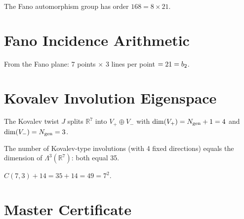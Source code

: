 \begin{theorem}[$|\mathrm{PSL}(2,7)| = \mathrm{rank}(E_8) \times \btwo$]\label{thm:PSL27_factored}
    \leanok
    The Fano automorphism group has order $168 = 8 \times 21$.
\end{theorem}

\section{Fano Incidence Arithmetic}

\begin{theorem}[$\btwo = \opdim(K_7) \times N_{\mathrm{gen}}$]\label{thm:b2_fano_incidence}
    \leanok
    From the Fano plane: 7 points $\times$ 3 lines per point $= 21 = b_2$.
\end{theorem}

\section{Kovalev Involution Eigenspace}

\begin{theorem}\label{thm:kovalev_eigenspace}
    \leanok
    The Kovalev twist $J$ splits $\mathbb{R}^7$ into $V_+ \oplus V_-$
    with $\mathrm{dim}(V_+) = N_{\mathrm{gen}} + 1 = 4$ and
    $\mathrm{dim}(V_-) = N_{\mathrm{gen}} = 3$.
\end{theorem}

\begin{theorem}[$C(7,4) = C(7,3) = 35$]\label{thm:kovalev_3form}
    \leanok
    The number of Kovalev-type involutions (with 4 fixed directions) equals
    the dimension of $\Lambda^3(\mathbb{R}^7)$: both equal 35.
\end{theorem}

\begin{theorem}[$35 + \opdim(\Gtwo) = \opdim(K_7)^2$]\label{thm:3form_plus_G2}
    \leanok
    $C(7,3) + 14 = 35 + 14 = 49 = 7^2$.
\end{theorem}

\section{Master Certificate}

